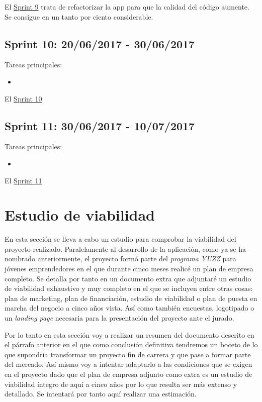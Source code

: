 
El \underline{Sprint 9} trata de refactorizar la app para que la calidad del código aumente. Se consigue en un tanto por ciento considerable. 

\subsection{Sprint 10: 20/06/2017 - 30/06/2017}\label{sprint10}

Tareas principales:

\begin{itemize}
	\item 
\end{itemize}


El \underline{Sprint 10} 

\subsection{Sprint 11: 30/06/2017 - 10/07/2017}\label{sprint11}

Tareas principales:

\begin{itemize}
	\item 
\end{itemize}


El \underline{Sprint 11} 


\section{Estudio de viabilidad}\label{estudio-viabilidad}
En esta sección se lleva a cabo un estudio para comprobar la viabilidad del proyecto realizado. Paralelamente al desarrollo de la aplicación, como ya se ha nombrado anteriormente, el proyecto formó parte del \emph{programa YUZZ } para jóvenes emprendedores en el que durante cinco meses realicé un plan de empresa completo. Se detalla por tanto en un documento extra que adjuntaré un estudio de viabilidad exhaustivo  y muy completo en el que se incluyen entre otras cosas: plan de marketing, plan de financiación, estudio de viabilidad o plan de puesta en marcha del negocio a cinco años vista. Así como también encuestas, logotipado o un \emph{landing page} necesaria para la presentación del proyecto ante el jurado. 

Por lo tanto en esta sección voy a realizar un resumen del documento descrito en el párrafo anterior en el que como conclusión definitiva tendremos un boceto de lo que supondría transformar un proyecto fin de carrera y que pase a formar parte del mercado. Así mismo voy a intentar adaptarlo a las condiciones que se exigen en el proyecto dado que el plan de empresa adjunto como extra es un estudio de viabilidad íntegro de aquí a cinco años por lo que resulta ser más extenso y detallado. Se intentará por tanto aquí realizar una estimación.

